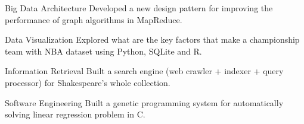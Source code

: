 \begin{cvskills}

  \cvskill
    {Big Data Architecture} %
    {Developed a new design pattern for improving the performance of graph
    algorithms in MapReduce.} %

  \cvskill
    {Data Visualization} %
    {Explored what are the key factors that make a championship team
    with NBA dataset using Python, SQLite and R.} %

  \cvskill
    {Information Retrieval} %
    {Built a search engine (web crawler + indexer + query
    processor) for Shakespeare's whole collection.} %

  \cvskill
    {Software Engineering} %
    {Built a genetic programming system for automatically solving
    linear regression problem in C.}

\end{cvskills}
